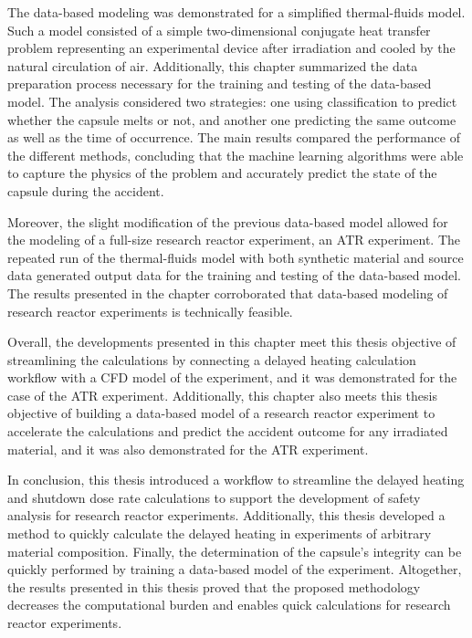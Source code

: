 The data-based modeling was demonstrated for a simplified thermal-fluids model.
Such a model consisted of a simple two-dimensional conjugate heat transfer problem representing an experimental device after irradiation and cooled by the natural circulation of air.
Additionally, this chapter summarized the data preparation process necessary for the training and testing of the data-based model.
The analysis considered two strategies: one using classification to predict whether the capsule melts or not, and another one predicting the same outcome as well as the time of occurrence.
The main results compared the performance of the different methods, concluding that the machine learning algorithms were able to capture the physics of the problem and accurately predict the state of the capsule during the accident.

Moreover, the slight modification of the previous data-based model allowed for the modeling of a full-size research reactor experiment, an ATR experiment.
The repeated run of the thermal-fluids model with both synthetic material and source data generated output data for the training and testing of the data-based model.
The results presented in the chapter corroborated that data-based modeling of research reactor experiments is technically feasible.

Overall, the developments presented in this chapter meet this thesis objective of streamlining the calculations by connecting  a delayed heating calculation workflow with a CFD model of the experiment, and it was demonstrated for the case of the ATR experiment.
Additionally, this chapter also meets this thesis objective of building a data-based model of a research reactor experiment to accelerate the calculations and predict the accident outcome for any irradiated material, and it was also demonstrated for the ATR experiment.

In conclusion, this thesis introduced a workflow to streamline the delayed heating and shutdown dose rate calculations to support the development of safety analysis for research reactor experiments.
Additionally, this thesis developed a method to quickly calculate the delayed heating in experiments of arbitrary material composition.
Finally, the determination of the capsule's integrity can be quickly performed by training a data-based model of the experiment.
Altogether, the results presented in this thesis proved that the proposed methodology decreases the computational burden and enables quick calculations for research reactor experiments.


